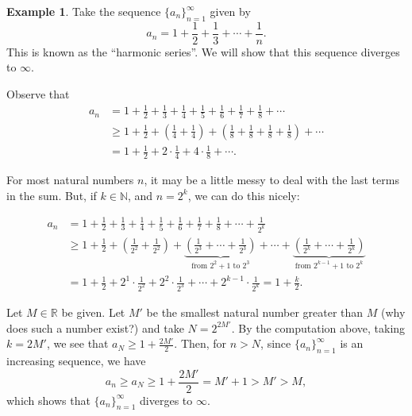 \documentclass[12pt]{amsart}
\newcommand{\R}{{\mathbb{R}}}
\newcommand{\N}{\mathbb{N}}
\numberwithin{equation}{section}
\theoremstyle{plain} %
\newtheorem{cor}[equation]{Corollary}
\theoremstyle{definition}
\newtheorem{ex}[equation]{Example}
\theoremstyle{remark}
\begin{document}
\begin{ex}
Take the sequence $\{a_n\}_{n=1}^{\infty}$ given by\[ a_n = 1 + \frac{1}{2} + \frac{1}{3} + \cdots + \frac{1}{n}.\] This is known as the ``harmonic series''. We will show that this sequence diverges to $\infty$. 

Observe that
\begin{align*} a_n &= 1 + \frac{1}{2} + \frac{1}{3} + \frac{1}{4} + \frac{1}{5} + \frac{1}{6} + \frac{1}{7} + \frac{1}{8} + \cdots \\
&\geq 1 + \frac{1}{2} + \left(\frac{1}{4} + \frac{1}{4}\right) + \left(\frac{1}{8} + \frac{1}{8} + \frac{1}{8} + \frac{1}{8}\right) + \cdots\\
&=1 + \frac{1}{2} + 2 \cdot \frac{1}{4} + 4 \cdot \frac{1}{8} + \cdots.\end{align*}


For most natural numbers $n$, it may be a little messy to deal with the last terms in the sum. But, if $k\in \N$, and $n=2^k$, we can do this nicely:

\begin{align*} a_n &= 1 + \frac{1}{2} + \frac{1}{3} + \frac{1}{4} + \frac{1}{5} + \frac{1}{6} + \frac{1}{7} + \frac{1}{8} + \cdots + \frac{1}{2^k} \\
&\geq 1 + \frac{1}{2} + \left(\frac{1}{2^2} + \frac{1}{2^2}\right) + \underbrace{\left(\frac{1}{2^3} + \cdots + \frac{1}{2^3}\right)}_{\text{from $2^2+1$ to $2^3$}} + \cdots + \underbrace{\left(\frac{1}{2^k} + \cdots + \frac{1}{2^k}\right)}_{\text{from $2^{k-1}+1$ to $2^{k}$}} \\
&=1 + \frac{1}{2} + 2^1 \cdot \frac{1}{2^2} + 2^2 \cdot \frac{1}{2^3} + \cdots + 2^{k-1} \cdot \frac{1}{2^k} = 1+ \frac{k}{2}.\end{align*}
\end{ex}

Let $M\in \R$ be given. Let $M'$ be the smallest natural number greater than $M$ (why does such a number exist?) and take $N=2^{2M'}$. By the computation above, taking $k=2M'$, we see that $a_N \geq 1 + \frac{2M'}{2}$. Then, for $n>N$, since $\{a_n\}_{n=1}^{\infty}$ is an increasing sequence, we have
\[ a_n \geq a_N \geq 1 + \frac{2M'}{2} = M' + 1 > M' > M,\]
which shows that $\{a_n\}_{n=1}^\infty$ diverges to $\infty$.





\end{document}
